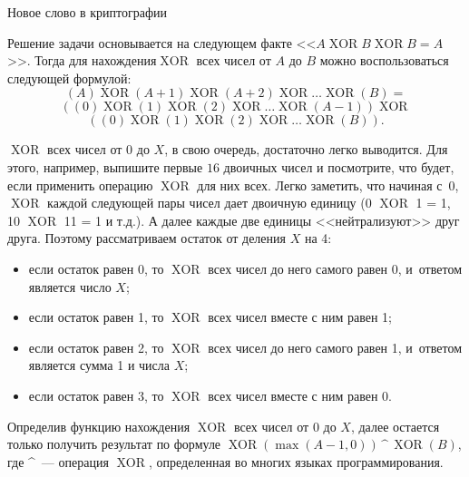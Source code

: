 \begin{tutorial}{Новое слово в криптографии}

\newcommand{\XOR}{\mathop{\mathrm{XOR}}}
Решение задачи основывается на следующем факте <<$A \XOR  B \XOR  B = A$>>. Тогда для нахождения$ \XOR$  всех чисел от $A$ до $B$ можно воспользоваться следующей формулой:
$$(A) \XOR  (A+1) \XOR  (A+2) \XOR \ldots\XOR  (B) =$$
$$((0)\XOR (1)\XOR (2)\XOR \ldots\XOR (A-1))\XOR $$
$$((0)\XOR (1)\XOR (2)\XOR \ldots\XOR (B)).$$

$\XOR$  всех чисел от $0$ до $X$, в свою очередь, достаточно легко выводится. Для этого, например, выпишите первые $16$ двоичных чисел и посмотрите, что будет, если применить операцию $\XOR$  для них всех. Легко заметить, что начиная с~$0$, $\XOR$  каждой следующей пары чисел дает двоичную единицу (0 $\XOR$  1 = 1, 10 $\XOR$  11 = 1 и т.д.). А далее каждые две единицы <<нейтрализуют>> друг друга. Поэтому рассматриваем остаток от деления $X$ на 4:
\begin{itemize}
  \item если остаток равен 0, то $\XOR$  всех чисел до него самого равен 0, и~ответом является число $X$;
  \item если остаток равен 1, то $\XOR$  всех чисел вместе с ним равен 1;
  \item если остаток равен 2, то $\XOR$  всех чисел до него самого равен 1, и~ответом является сумма 1 и числа $X$;
  \item если остаток равен 3, то $\XOR$  всех чисел вместе с ним равен 0.
\end{itemize}

Определив функцию нахождения $\XOR$  всех чисел от $0$ до $X$, далее остается только получить результат по формуле $\XOR(\max(A-1,0)) \mathop{\mbox{\textasciicircum}} \XOR(B)$, где \textasciicircum~--- операция $\XOR$, определенная во многих языках программирования. 

\end{tutorial}
